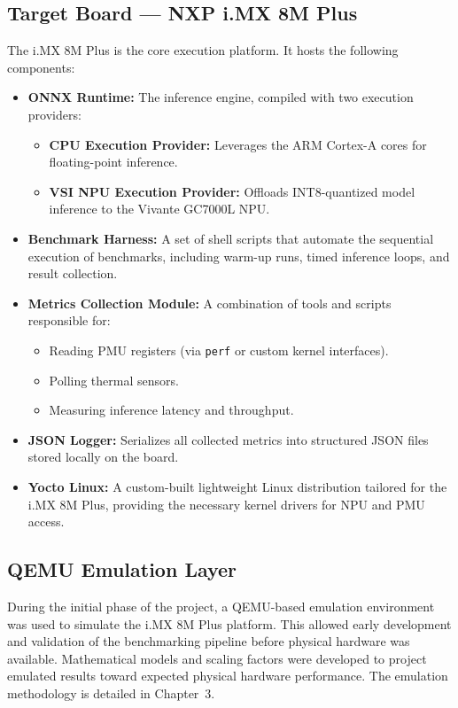 \subsection{Target Board — NXP i.MX 8M Plus}
The i.MX 8M Plus is the core execution platform. It hosts the following components:
\begin{itemize}
    \item \textbf{ONNX Runtime:} The inference engine, compiled with two execution providers:
    \begin{itemize}
        \item \textbf{CPU Execution Provider:} Leverages the ARM Cortex-A cores for floating-point inference.
        \item \textbf{VSI NPU Execution Provider:} Offloads INT8-quantized model inference to the Vivante GC7000L NPU.
    \end{itemize}
    \item \textbf{Benchmark Harness:} A set of shell scripts that automate the sequential execution of benchmarks, including warm-up runs, timed inference loops, and result collection.
    \item \textbf{Metrics Collection Module:} A combination of tools and scripts responsible for:
    \begin{itemize}
        \item Reading PMU registers (via \texttt{perf} or custom kernel interfaces).
        \item Polling thermal sensors.
        \item Measuring inference latency and throughput.
    \end{itemize}
    \item \textbf{JSON Logger:} Serializes all collected metrics into structured JSON files stored locally on the board.
    \item \textbf{Yocto Linux:} A custom-built lightweight Linux distribution tailored for the i.MX 8M Plus, providing the necessary kernel drivers for NPU and PMU access.
\end{itemize}

\subsection{QEMU Emulation Layer}
During the initial phase of the project, a QEMU-based emulation environment was used to simulate the i.MX 8M Plus platform. This allowed early development and validation of the benchmarking pipeline before physical hardware was available. Mathematical models and scaling factors were developed to project emulated results toward expected physical hardware performance. The emulation methodology is detailed in Chapter~3.


